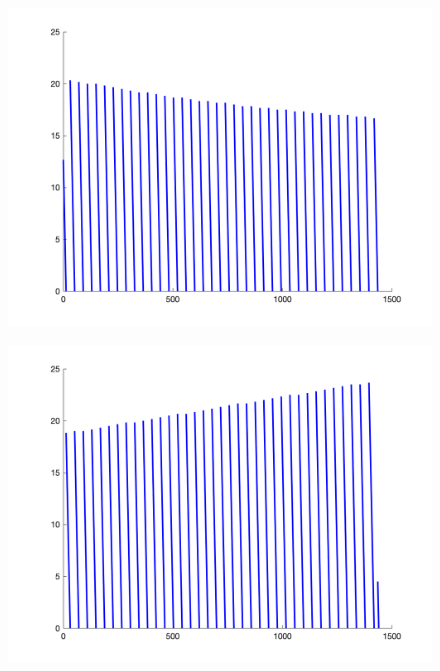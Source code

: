 \documentclass[withoutpreface,bwprint]{cumcmthesis} %
\begin{document}
\begin{figure}[H]
    \centering
    \begin{minipage}[c]{0.35\textwidth}
        \includegraphics[width=1\textwidth]{figures/2-2-0-up.png}
    \label{fig:my_label}
    \end{minipage}
\begin{minipage}[c]{0.35\textwidth}
    \includegraphics[width=1\textwidth]{figures/2-2-0-down.png}
    \label{fig:my_label}
\end{minipage}
 \begin{minipage}[c]{0.35\textwidth}

\end{minipage}
\end{figure}
\end{document}

